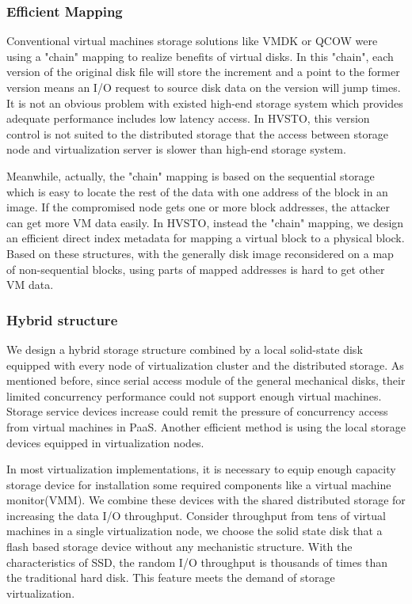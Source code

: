 \documentclass[conference]{IEEEtran}
\begin{document}
\subsubsection{Efficient Mapping}
Conventional virtual machines storage solutions like VMDK\cite{VMDK2007} or QCOW\cite{QCOW2007} were using a "chain" mapping to realize benefits of virtual disks. In this "chain", each version of the original disk file will store the increment and a point to the former version means an I/O request to source disk data on the  version will jump  times. It is not an obvious problem with existed high-end storage system which provides adequate performance includes low latency access. In HVSTO, this version control is not suited to the distributed storage that the access between storage node and virtualization server is slower than high-end storage system.

Meanwhile, actually, the "chain" mapping is based on the sequential storage which is easy to locate the rest of the data with one address of the block in an image. If the compromised node gets one or more block addresses, the attacker can get more VM data easily. In HVSTO, instead the "chain" mapping, we design an efficient direct index metadata for mapping a virtual block to a physical block. Based on these structures, with the generally disk image reconsidered on a map of non-sequential blocks, using parts of mapped addresses is hard to get other VM data.


\subsubsection{Hybrid structure}
We design a hybrid storage structure combined by a local solid-state disk equipped with every node of virtualization cluster and the distributed storage. As mentioned before, since serial access module of the general mechanical disks, their limited concurrency performance could not support enough virtual machines. Storage service devices increase could remit the pressure of concurrency access from virtual machines in PaaS. Another efficient method is using the local storage devices equipped in virtualization nodes.

In most virtualization implementations, it is necessary to equip enough capacity storage device for installation some required components like a virtual machine monitor(VMM)\cite{Barham2003}. We combine these devices with the shared distributed storage for increasing the data I/O throughput. Consider throughput from tens of virtual machines in a single virtualization node, we choose the solid state disk that a flash based storage device without any mechanistic structure. With the characteristics of SSD, the random I/O throughput is thousands of times than the traditional hard disk. This feature meets the demand of storage virtualization\cite{Agrawal2008}.
\end{document}
